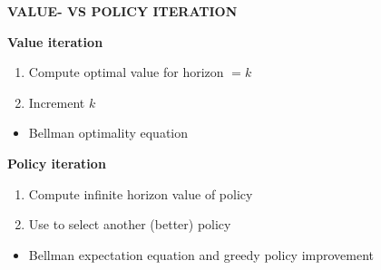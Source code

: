 \begin{whitebox}{\textbf{VALUE- VS POLICY ITERATION}}
    \begin{center}
        \begin{minipage}[l]{0.4\linewidth}
            \small
            \textbf{Value iteration}
            \begin{enumerate}
                \item Compute optimal value for horizon $=k$
                \item Increment $k$
            \end{enumerate}
            \begin{itemize}
                \item Bellman optimality equation
            \end{itemize}
        \end{minipage}%
        \hspace{5mm}
        \begin{minipage}[c]{0.4\linewidth}
            \centering
            \small
            \textbf{Policy iteration}
            \begin{enumerate}
                \item Compute infinite horizon value of policy
                \item Use to select another (better) policy
            \end{enumerate}
            \begin{itemize}
                \item Bellman expectation equation and greedy policy improvement
            \end{itemize}
        \end{minipage}
    \end{center}
\end{whitebox}

